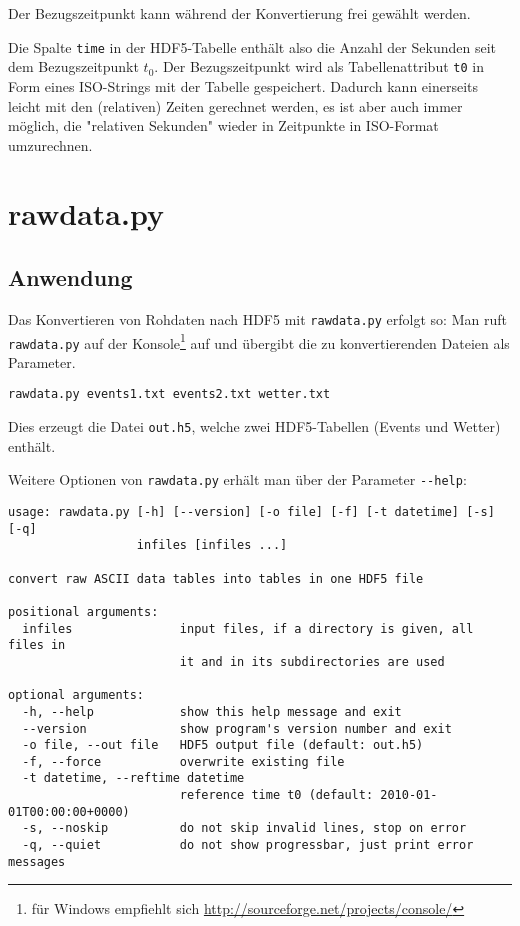 \documentclass[version=last,
	a4paper,			%
	pagesize, 			%
	11pt,				%
	BCOR1cm,			%
	DIV12,	 			%
	pointlessnumbers,   %
	halfparskip,		%
]{scrreprt}
\begin{document}
Der Bezugszeitpunkt kann während der Konvertierung frei gewählt werden.

Die Spalte \texttt{time} in der HDF5-Tabelle enthält also  die Anzahl der Sekunden seit dem Bezugszeitpunkt $t_0$. Der Bezugszeitpunkt wird als Tabellenattribut \texttt{t0} in Form eines ISO-Strings mit der Tabelle gespeichert. Dadurch kann einerseits leicht mit den (relativen) Zeiten gerechnet werden, es ist aber auch immer möglich, die "relativen Sekunden" wieder in Zeitpunkte in ISO-Format umzurechnen.

\section{rawdata.py}
\subsection{Anwendung}
Das Konvertieren von Rohdaten nach HDF5 mit \texttt{rawdata.py} erfolgt so: Man ruft \texttt{rawdata.py} auf der Konsole\footnote{für Windows empfiehlt sich \url{http://sourceforge.net/projects/console/}} auf und übergibt die zu konvertierenden Dateien als Parameter.
\begin{lstlisting}
rawdata.py events1.txt events2.txt wetter.txt
\end{lstlisting}
Dies erzeugt die Datei \texttt{out.h5}, welche zwei HDF5-Tabellen (Events und Wetter) enthält.

Weitere Optionen von \texttt{rawdata.py} erhält man über der Parameter \verb"--help":
\begin{lstlisting}[caption={Kommandozeilen-Hilfe von rawdata.py}]
usage: rawdata.py [-h] [--version] [-o file] [-f] [-t datetime] [-s] [-q]
                  infiles [infiles ...]

convert raw ASCII data tables into tables in one HDF5 file

positional arguments:
  infiles               input files, if a directory is given, all files in
                        it and in its subdirectories are used

optional arguments:
  -h, --help            show this help message and exit
  --version             show program's version number and exit
  -o file, --out file   HDF5 output file (default: out.h5)
  -f, --force           overwrite existing file
  -t datetime, --reftime datetime
                        reference time t0 (default: 2010-01-01T00:00:00+0000)
  -s, --noskip          do not skip invalid lines, stop on error
  -q, --quiet           do not show progressbar, just print error messages
\end{lstlisting}
\end{document}
